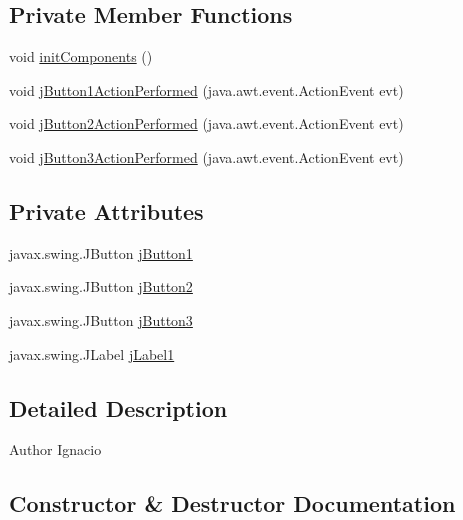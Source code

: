 \subsection*{Private Member Functions}
\begin{DoxyCompactItemize}
\item 
void \mbox{\hyperlink{class_sockets_1_1_modulo_control_a89b520fe4d92108d39252c5182434710}{init\+Components}} ()
\item 
void \mbox{\hyperlink{class_sockets_1_1_modulo_control_ae864493081b3e1283a46cdc204ce5901}{j\+Button1\+Action\+Performed}} (java.\+awt.\+event.\+Action\+Event evt)
\item 
void \mbox{\hyperlink{class_sockets_1_1_modulo_control_a015a69f71af71f04bd6ebd98ff9256ce}{j\+Button2\+Action\+Performed}} (java.\+awt.\+event.\+Action\+Event evt)
\item 
void \mbox{\hyperlink{class_sockets_1_1_modulo_control_a47a2f457c69a1633c1ba878b02220170}{j\+Button3\+Action\+Performed}} (java.\+awt.\+event.\+Action\+Event evt)
\end{DoxyCompactItemize}
\subsection*{Private Attributes}
\begin{DoxyCompactItemize}
\item 
javax.\+swing.\+J\+Button \mbox{\hyperlink{class_sockets_1_1_modulo_control_a96f51c5e98e140c3840d8b7a25288101}{j\+Button1}}
\item 
javax.\+swing.\+J\+Button \mbox{\hyperlink{class_sockets_1_1_modulo_control_a93397e8a9f08ee30ecf474a4ac9a7b9e}{j\+Button2}}
\item 
javax.\+swing.\+J\+Button \mbox{\hyperlink{class_sockets_1_1_modulo_control_a30b4d0c6e8a1cb2425561314db79783a}{j\+Button3}}
\item 
javax.\+swing.\+J\+Label \mbox{\hyperlink{class_sockets_1_1_modulo_control_a89f2debd0d83f763fe0bb701e05da054}{j\+Label1}}
\end{DoxyCompactItemize}


\subsection{Detailed Description}
\begin{DoxyAuthor}{Author}
Ignacio 
\end{DoxyAuthor}


\subsection{Constructor \& Destructor Documentation}
\mbox{\label{class_sockets_1_1_modulo_control_a45556bb63f8210bc421e40d207a52ea9}} 
